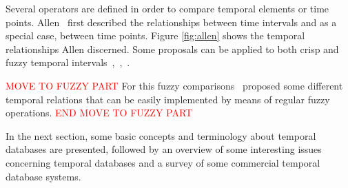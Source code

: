 Several operators are defined in order to compare temporal elements or time points. Allen~\cite{Allen83} first described the relationships between time intervals and as a special case, between time points. Figure \ref{fig:allen} shows the temporal relationships Allen discerned. Some proposals can be applied to both crisp and fuzzy temporal intervals~\cite{ohlbach2004},~\cite{nagypal2003},~\cite{schockaert08}. 

\textcolor{red}{MOVE TO FUZZY PART}
For this fuzzy comparisons~\cite{garrido2009} proposed some different temporal relations that can be easily implemented by means of regular fuzzy operations.
\textcolor{red}{END MOVE TO FUZZY PART}

In the next section, some basic concepts and terminology about temporal databases are presented, followed by an overview of some interesting issues concerning temporal databases and a survey of some commercial temporal database systems.